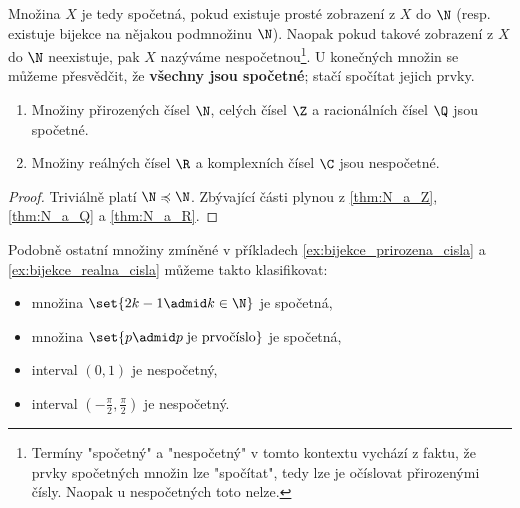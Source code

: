 Množina $X$ je tedy spočetná, pokud existuje prosté zobrazení z $X$ do $\N$ (resp. existuje bijekce na nějakou podmnožinu $\N$). Naopak pokud takové zobrazení z $X$ do $\N$ neexistuje, pak $X$ nazýváme nespočetnou\footnote{Termíny "spočetný" a "nespočetný" v tomto kontextu vychází z faktu, že prvky spočetných množin lze "spočítat", tedy lze je očíslovat přirozenými čísly. Naopak u nespočetných toto nelze.}. U konečných množin se můžeme přesvědčit, že \textbf{všechny jsou spočetné}; stačí spočítat jejich prvky.
\begin{theorem}\label{thm:spocetnost_ciselnych_oboru}
    \begin{enumerate}[label=(\roman*)]
        \item Množiny přirozených čísel $\N$, celých čísel $\Z$ a racionálních čísel $\Q$ jsou spočetné.
        \item Množiny reálných čísel $\R$ a komplexních čísel $\C$ jsou nespočetné.
    \end{enumerate}
\end{theorem}
\begin{proof}
    Triviálně platí $\N\preccurlyeq\N$. Zbývající části plynou z \ref{thm:N_a_Z}, \ref{thm:N_a_Q} a \ref{thm:N_a_R}.
\end{proof}
Podobně ostatní množiny zmíněné v příkladech \ref{ex:bijekce_prirozena_cisla} a \ref{ex:bijekce_realna_cisla} můžeme takto klasifikovat:
\begin{itemize}
    \item množina $\set{2k-1 \admid k\in\N}$ je spočetná,
    \item množina $\set{p \admid p\;\text{je prvočíslo}}$ je spočetná,
    \item interval $(0,1)$ je nespočetný,
    \item interval $\displaystyle\left(-\frac{\pi}{2},\frac{\pi}{2}\right)$ je nespočetný.
\end{itemize}
\medskip

